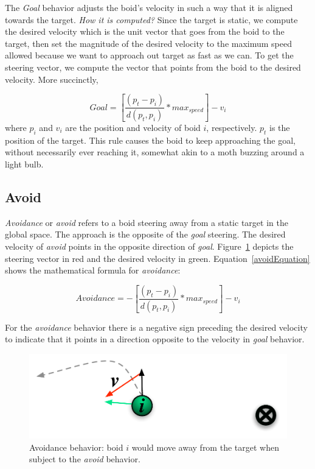 The \textit{Goal} behavior adjusts the boid's velocity in such a way that it is aligned towards the target. \textit{How it is computed?} Since the target is static, we compute the desired velocity which is the unit vector that goes from the boid to the target, then set the magnitude of the desired velocity to the maximum speed allowed because we want to approach out target as fast as we can. To get the steering vector, we compute the vector that points from the boid to the desired velocity. More succinctly, 

\begin{equation}
\label{goalEquation}
Goal = \left[\frac{(p_t - p_i)}{d(p_t,p_i)} * max_{speed} \right] - v_i
\end{equation}
where $p_i$ and $v_i$ are the position and velocity of boid $i$, respectively. $p_t$ is the position of the target. This rule causes the boid to keep approaching the goal, without necessarily ever reaching it, somewhat akin to a moth buzzing around a light bulb.

\subsection{Avoid}
\textit{Avoidance} or \textit{avoid} refers to a boid steering away from a static target in the global space. The approach is the opposite of the \textit{goal} steering. The desired velocity of \textit{avoid} points in the opposite direction of \textit{goal}. Figure~\ref{avoidPDF} depicts the steering vector in red and the desired velocity in green. Equation~\ref{avoidEquation} shows the mathematical formula for \textit{avoidance}:

\begin{equation}
\label{avoidEquation}
Avoidance = -\left[\frac{(p_t - p_i)}{d(p_t,p_i)} * max_{speed} \right] - v_i
\end{equation}

For the \textit{avoidance} behavior there is a negative sign preceding the desired velocity to indicate that it points in a direction opposite to the velocity in \textit{goal} behavior.

\begin{figure}[htbp]
\begin{center}
\includegraphics[scale=0.75]{figures/avoidance.pdf}
\caption{Avoidance behavior: boid $i$ would move away from the target when subject to the \textit{avoid} behavior.}
\label{avoidPDF}
\end{center}
\end{figure}

